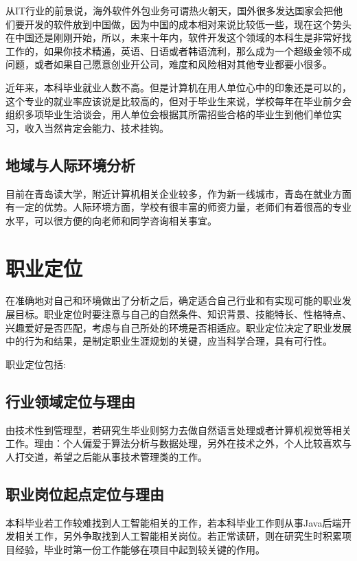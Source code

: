 \documentclass{article}
\begin{document}
从IT行业的前景说，海外软件外包业务可谓热火朝天，国外很多发达国家会把他们要开发的软件放到中国做，因为中国的成本相对来说比较低一些，现在这个势头在中国还是刚刚开始，所以，未来十年内，软件开发这个领域的本科生是非常好找工作的，如果你技术精通，英语、日语或者韩语流利，那么成为一个超级金领不成问题，或者如果自己愿意创业开公司，难度和风险相对其他专业都要小很多。

近年来，本科毕业就业人数不高。但是计算机在用人单位心中的印象还是可以的，这个专业的就业率应该说是比较高的，但对于毕业生来说，学校每年在毕业前夕会组织多项毕业生洽谈会，用人单位会根据其所需招些合格的毕业生到他们单位实习，收入当然肯定会能力、技术挂钩。\par


\subsection{地域与人际环境分析}
目前在青岛读大学，附近计算机相关企业较多，作为新一线城市，青岛在就业方面有一定的优势。人际环境方面，学校有很丰富的师资力量，老师们有着很高的专业水平，可以很方便的向老师和同学咨询相关事宜。\par
\par 
\iffalse
图片插入的样例：\par
\begin{figure}[h!]
\centering
\texttt{[image: universe]}
\caption{The Universe}
\label{fig:universe}
\end{figure}
\fi


\section{职业定位}
在准确地对自己和环境做出了分析之后，确定适合自己行业和有实现可能的职业发展目标。职业定位时要注意与自己的自然条件、知识背景、技能特长、性格特点、兴趣爱好是否匹配，考虑与自己所处的环境是否相适应。职业定位决定了职业发展中的行为和结果，是制定职业生涯规划的关键，应当科学合理，具有可行性。\par
职业定位包括:\par

\subsection{行业领域定位与理由}
由技术性到管理型，若研究生毕业则努力去做自然语言处理或者计算机视觉等相关工作。理由：个人偏爱于算法分析与数据处理，另外在技术之外，个人比较喜欢与人打交道，希望之后能从事技术管理类的工作。\par
\subsection{职业岗位起点定位与理由}
本科毕业若工作较难找到人工智能相关的工作，若本科毕业工作则从事Java后端开发相关工作，另外争取找到人工智能相关岗位。若正常读研，则在研究生时积累项目经验，毕业时第一份工作能够在项目中起到较关键的作用。\par
\end{document}
